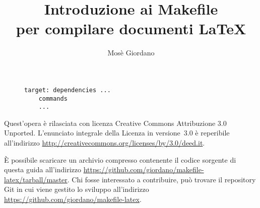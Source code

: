 \documentclass[a4paper]{article}
\title{Introduzione ai Makefile \\
  per compilare documenti \LaTeX}
\author{Mosè Giordano}
\begin{document}
\maketitle

\begin{figure}[h]
  \centering
  \begin{minipage}{0.48\linewidth}
\begin{lstlisting}
target: dependencies ...
	commands
	...
\end{lstlisting}
  \end{minipage}
\end{figure}

{\small \tableofcontents}






\printbibliography

\vfill

\noindent Quest'opera è rilasciata con licenza Creative Commons Attribuzione 3.0
Unported.  L'enunciato integrale della Licenza in versione~3.0 è reperibile
all'indirizzo \url{http://creativecommons.org/licenses/by/3.0/deed.it}.

È possibile scaricare un archivio compresso contenente il codice sorgente di
questa guida all'indirizzo
\url{https://github.com/giordano/makefile-latex/tarball/master}.  Chi fosse
interessato a contribuire, può trovare il repository Git in cui viene gestito lo
sviluppo all'indirizzo \url{https://github.com/giordano/makefile-latex}.
\end{document}

